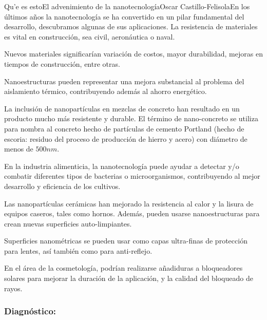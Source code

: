 \begin{Artikel}{Qu'e es esto}{El advenimiento de la nanotecnolog\'ia}{Oscar Castillo-Felisola}{En los \'ultimos a\~nos la nanotecnolog\'ia se ha convertido en un pilar fundamental del desarrollo, descubramos algunas de sus aplicaciones.}
La resistencia de materiales es vital en construcci\'on, sea civil, aeron\'autica o naval. 

Nuevos materiales significar\'ian variaci\'on de costos, mayor durabilidad, mejoras en tiempos de construcci\'on, entre otras.

Nanoestructuras pueden representar una mejora substancial al problema del aislamiento t\'ermico, contribuyendo adem\'as al ahorro energ\'etico.

La inclusi\'on de nanopart\'iculas en mezclas de concreto han resultado en un producto mucho m\'as resistente y durable. El t\'ermino de nano-concreto se utiliza para nombra al concreto hecho de part\'iculas de cemento Portland (hecho de escoria: residuo del proceso de producci\'on de hierro y acero) con di\'ametro de menos de $500 n m$.


En la industria alimenticia, la nanotecnolog\'ia puede ayudar a detectar y/o combatir diferentes tipos de bacterias o microorganismos, contribuyendo al mejor desarrollo y eficiencia de los cultivos.

Las nanopart\'iculas cer\'amicas han mejorado la resistencia al calor y la lisura de equipos caseros, tales como hornos. Adem\'as, pueden usarse nanoestructuras para crean nuevas superficies auto-limpiantes.

Superficies nanom\'etricas se pueden usar como capas ultra-finas de protecci\'on para lentes, as\'i tambi\'en como para anti-reflejo.

En el \'area de la cosmetolog\'ia, podr\'ian realizarse a\~nadiduras a bloqueadores solares para mejorar la duraci\'on de la aplicaci\'on, y la calidad del bloqueado de rayos.





\subsubsection*{Diagn\'ostico:}


\end{Artikel}
